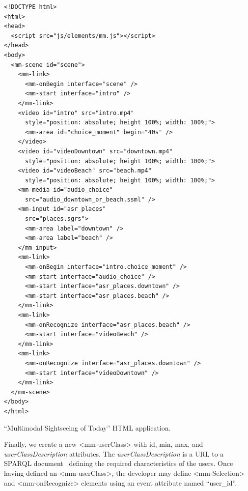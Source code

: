 \begin{verbatim}
<!DOCTYPE html>
<html>
<head>
  <script src="js/elements/mm.js"></script>
</head>
<body>
  <mm-scene id="scene">
    <mm-link>
      <mm-onBegin interface="scene" />
      <mm-start interface="intro" />
    </mm-link>
    <video id="intro" src="intro.mp4"
      style="position: absolute; height 100%; width: 100%;">
      <mm-area id="choice_moment" begin="40s" />
    </video>
    <video id="videoDowntown" src="downtown.mp4"
      style="position: absolute; height 100%; width: 100%;">
    <video id="videoBeach" src="beach.mp4"
      style="position: absolute; height 100%; width: 100%;">
    <mm-media id="audio_choice"
      src="audio_downtown_or_beach.ssml" />
    <mm-input id="asr_places"
      src="places.sgrs">
      <mm-area label="downtown" />
      <mm-area label="beach" />
    </mm-input>
    <mm-link>
      <mm-onBegin interface="intro.choice_moment" />
      <mm-start interface="audio_choice" />
      <mm-start interface="asr_places.downtown" />
      <mm-start interface="asr_places.beach" />
    </mm-link>
    <mm-link>
      <mm-onRecognize interface="asr_places.beach" />
      <mm-start interface="videoBeach" />
    </mm-link>
    <mm-link>
      <mm-onRecognize interface="asr_places.downtown" />
      <mm-start interface="videoDowntown" />
    </mm-link>
  </mm-scene>
</body>
</html>
\end{verbatim}
\begin{listing}[!hb]
\caption{“Multimodal Sightseeing of Today” HTML application.}
\label{list:html-sightseeing}
\end{listing}

Finally, we create a new <mm-userClass> with id, min, max, and
\textit{userClassDescription} attributes. The \textit{userClassDescription} is
a URL to a SPARQL
document~\cite{w3c_sparql_2008} defining the required characteristics of the users. Once having
defined an <mm-userClass>, the developer may define <mm-Selection> and
<mm-onRecognize> elements using an event attribute named “user\_id”.